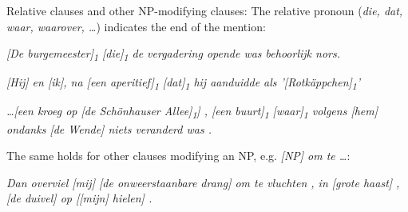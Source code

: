 \begin{itemize*}
\item Relative clauses and other NP-modifying clauses:
    The relative pronoun (\emph{die, dat, waar, waarover, \dots}) indicates the end of the mention:

    \begin{itemize*}
    \item \emph{\n{[}[De burgemeester]\textsubscript{1} {[}die{]}\textsubscript{1} de vergadering opende\n{]} was behoorlijk nors.}
    \item \emph{[Hij] en [ik], na [een aperitief]\textsubscript{1} [dat]\textsubscript{1} hij aanduidde als '[Rotkäppchen]\textsubscript{1}'}
    \item \emph{\dots [een kroeg op [de Schönhauser Allee]\textsubscript{1}] , [een buurt]\textsubscript{1} [waar]\textsubscript{1} volgens [hem] ondanks [de Wende] niets veranderd was .}
    \end{itemize*}

    The same holds for other clauses modifying an NP,
    e.g. \emph{[NP] om te \dots}:

    \emph{Dan overviel [mij] [de onweerstaanbare drang] om te vluchten , in [grote haast] , [de duivel] op [[mijn] hielen] . }

\end{itemize*}

